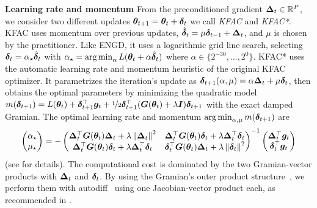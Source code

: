 \textbf{Learning rate and momentum} From the preconditioned gradient ${\bm{\Delta}}_t \in {\mathbb{R}}^P$, we consider two different updates $ {\bm{\theta}}_{t+1} = {\bm{\theta}}_t + {\bm{\delta}}_{t}$ we call \emph{KFAC} and \emph{KFAC*}.
KFAC uses momentum over previous updates, $\hat{{\bm{\delta}}}_t = \mu {\bm{\delta}}_{t-1} + {\bm{\Delta}}_t$, and $\mu$ is chosen by the practitioner.
Like ENGD, it uses a logarithmic grid line search, selecting ${\bm{\delta}}_t = \alpha_{\star} \hat{{\bm{\delta}}}_t$ with $\alpha_{\star} = \operatorname*{arg\,min}_{\alpha} L({\bm{\theta}}_t + \alpha \hat{{\bm{\delta}}}_t)$ where $\alpha \in \{2^{-30}, \dots, 2^0\}$.
KFAC* uses the automatic learning rate and momentum heuristic of the original KFAC optimizer.
It parametrizes the iteration's update as ${\bm{\delta}}_{t+1}(\alpha, \mu) = \alpha {\bm{\Delta}}_t + \mu {\bm{\delta}}_t$, then obtains the optimal parameters by minimizing the quadratic model $m({\bm{\delta}}_{t+1}) = L({\bm{\theta}}_t) + {\bm{\delta}}_{t+1}^{\top} {\bm{g}}_t + \nicefrac{1}{2}{\bm{\delta}}_{t+1}^{\top} ({\bm{G}}({\bm{\theta}}_t) + \lambda {\bm{I}}) {\bm{\delta}}_{t+1}$ with the exact damped Gramian.
The optimal learning rate and momentum $\operatorname*{arg\,min}_{\alpha, \mu} m({\bm{\delta}}_{t+1})$ are
\begin{align*}
  \begin{pmatrix}
    \alpha_{\star} \\ \mu_{\star}
  \end{pmatrix}
  =
  -
  \begin{pmatrix}
    {\bm{\Delta}}_t^{\top} {\bm{G}}({\bm{\theta}}_t) {\bm{\Delta}}_t + \lambda \left\lVert {\bm{\Delta}}_t \right\rVert^2
    & {\bm{\Delta}}_t^{\top} {\bm{G}}({\bm{\theta}}_t) {\bm{\delta}}_t + \lambda {\bm{\Delta}}^{\top}_t {\bm{\delta}}_t
    \\
    {\bm{\Delta}}_t^{\top} {\bm{G}}({\bm{\theta}}_t) {\bm{\delta}}_t + \lambda {\bm{\Delta}}^{\top}_t {\bm{\delta}}_t
    &
      {\bm{\delta}}_t^{\top} {\bm{G}}({\bm{\theta}}_t) {\bm{\Delta}}_t + \lambda \left\lVert {\bm{\delta}}_t \right\rVert^2
  \end{pmatrix}^{-1}
  \begin{pmatrix}
    {\bm{\Delta}}_t^{\top} {\bm{g}}_t
    \\
    {\bm{\delta}}_t^{\top} {\bm{g}}_t
  \end{pmatrix}
\end{align*}
(see \citep[][Section 7]{martens2015optimizing} for details).
The computational cost is dominated by the two Gramian-vector products with ${\bm{\Delta}}_t$ and ${\bm{\delta}}_t$.
By using the Gramian's outer product structure~\cite{dangel2022vivit,papyan2019measurements}, we perform them with autodiff~\citep{pearlmutter1994fast,schraudolph2002fast} using one Jacobian-vector product each, as recommended in \cite{martens2015optimizing}.

